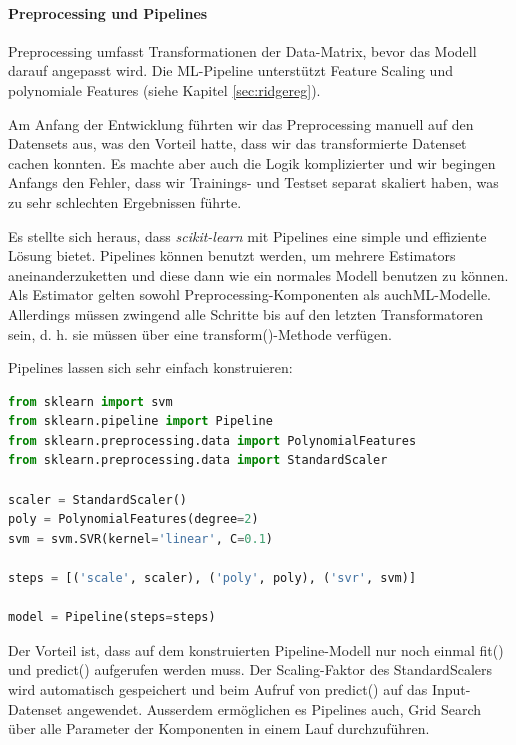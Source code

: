 \documentclass[10pt, a4paper]{article}
\begin{document}
\paragraph{Preprocessing und Pipelines} Preprocessing umfasst Transformationen der Data-Matrix, bevor das Modell darauf angepasst wird. Die ML-Pipeline unterstützt Feature Scaling und polynomiale Features (siehe Kapitel \ref{sec:ridgereg}).

Am Anfang der Entwicklung führten wir das Preprocessing manuell auf den Datensets aus, was den Vorteil hatte, dass wir das transformierte Datenset cachen konnten. Es machte aber auch die Logik komplizierter und wir begingen Anfangs den Fehler, dass wir Trainings- und Testset separat skaliert haben, was zu sehr schlechten Ergebnissen führte.

Es stellte sich heraus, dass \emph{scikit-learn} mit Pipelines eine simple und effiziente Lösung bietet. Pipelines können benutzt werden, um mehrere Estimators aneinanderzuketten und diese dann wie ein normales Modell benutzen zu können. \cite{sklearnpipelines} Als Estimator gelten sowohl Preprocessing-Komponenten als auch\ac{ML}-Modelle. Allerdings müssen zwingend alle Schritte bis auf den letzten Transformatoren sein, d. h. sie müssen über eine transform()-Methode verfügen.

Pipelines lassen sich sehr einfach konstruieren:

\begin{lstlisting}[language=Python, frame=single,caption={Python Pipeline Code}]
from sklearn import svm
from sklearn.pipeline import Pipeline
from sklearn.preprocessing.data import PolynomialFeatures
from sklearn.preprocessing.data import StandardScaler

scaler = StandardScaler()
poly = PolynomialFeatures(degree=2)
svm = svm.SVR(kernel='linear', C=0.1)

steps = [('scale', scaler), ('poly', poly), ('svr', svm)]

model = Pipeline(steps=steps)	
\end{lstlisting}

Der Vorteil ist, dass auf dem konstruierten Pipeline-Modell nur noch einmal fit() und predict() aufgerufen werden muss. Der Scaling-Faktor des StandardScalers wird automatisch gespeichert und beim Aufruf von predict() auf das Input-Datenset angewendet.
Ausserdem ermöglichen es Pipelines auch, Grid Search über alle Parameter der Komponenten in einem Lauf durchzuführen.
\end{document}
